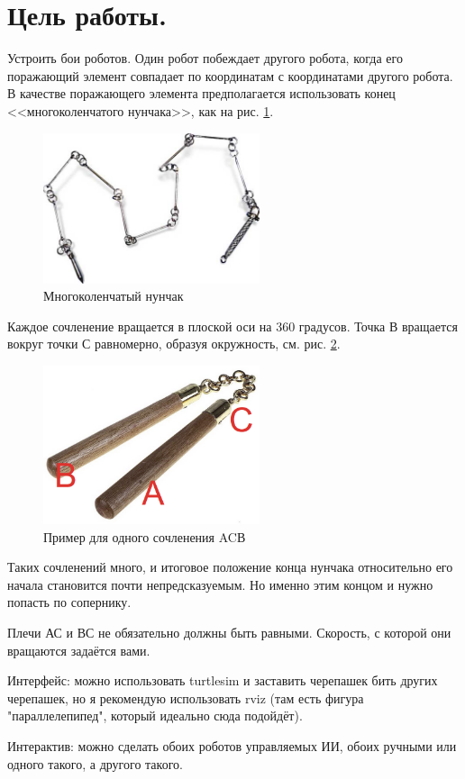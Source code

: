 \documentclass[14pt, a4paper]{extarticle}
\begin{document}
	\section{Цель работы.}
	Устроить бои роботов. Один робот побеждает другого робота, когда его поражающий элемент совпадает по координатам с координатами другого робота. В качестве поражающего элемента предполагается использовать конец <<многоколенчатого нунчака>>, как на рис. \ref{fig:mesh1}.
	\begin{figure}[h]
		\centering
		\includegraphics[width=2.5in]{b}
		\caption{Многоколенчатый нунчак}
		\label{fig:mesh1}
	\end{figure}
	Каждое сочленение вращается в плоской оси на 360 градусов.
	Точка В вращается вокруг точки С равномерно, образуя окружность, см. рис. \ref{fig:mesh2}.
	\begin{figure}[h]
		\centering
		\includegraphics[width=2.5in]{a}
		\caption{Пример для одного сочленения ACВ}
		\label{fig:mesh2}
	\end{figure}
	Таких сочленений много, и итоговое положение конца нунчака относительно его начала становится почти непредсказуемым. Но именно этим концом и нужно попасть по сопернику.
	
	Плечи АС и ВС не обязательно должны быть равными. Скорость, с которой они вращаются задаётся вами.
	
	Интерфейс: можно использовать turtlesim и заставить черепашек бить других черепашек, но я рекомендую использовать rviz (там есть фигура "параллелепипед", который идеально сюда подойдёт).
	
	Интерактив: можно сделать обоих роботов управляемых ИИ, обоих ручными или одного такого, а другого такого.
	
\end{document}
